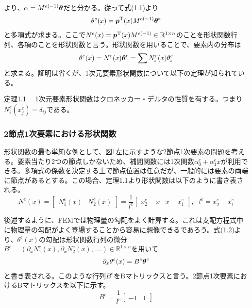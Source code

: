 \documentclass[dvipdfmx, 9pt, a4paper]{jsarticle}
\numberwithin{equation}{section}
\newcommand{\bm}[1]{{\mbox{\boldmath $#1$}}}
\begin{document}
より、$\alpha = M^{e(-1)}\bm \theta$だと分かる。従って式(1.1)より
\begin{equation}
\theta^e(x)=\bm p^{\rm T}(x)M^{e(-1)}\bm \theta^e \notag
\end{equation}
と多項式が求まる。ここで$N^e(x)=\bm p^{\rm T}(x)M^{e(-1)} \in \mathbb{R}^{1 \times n}$のことを形状関数行列、各項のことを形状関数と言う。形状関数を用いることで、要素内の分布は
\begin{equation}
\theta^e(x)=N^e(x)\bm \theta^e = \sum N^e_i(x)\theta^e_i
\end{equation}
と求まる。証明は省くが、1次元要素形状関数について以下の定理が知られている。
\begin{itembox}[l]{定理1.1}
　1次元要素形状関数はクロネッカー・デルタの性質を有する。つまり$N^e_i(x^e_j)=\delta_{ij}$である。
\end{itembox}
\subsubsection{2節点1次要素における形状関数}
形状関数の最も単純な例として、図1左に示すような2節点1次要素の問題を考える。要素当たり2つの節点しかないため、補間関数には1次関数$\alpha^e_0+\alpha^e_1x$が利用できる。多項式の係数を決定する上で節点位置は任意だが、一般的には要素の両端に節点があるとする。この場合、定理1.1より形状関数は以下のように書き表される。
\begin{equation}
N^e(x)=
\begin{bmatrix}
N^e_1(x) & N^e_2(x)
\end{bmatrix}
=\frac{1}{l^e}
\begin{bmatrix}
x^e_2 - x & x - x^e_1
\end{bmatrix},~~~l^e = x^e_2 - x^e_1
\end{equation}\par
後述するように、FEMでは物理量の勾配をよく計算する。これは支配方程式中に物理量の勾配がよく登場することから容易に想像できるであろう。式(1.2)より、$\theta^e(x)$の勾配は形状関数行列の微分$B^e=(\partial_xN^e_1(x), \partial_xN^e_2(x), ....) \in \mathbb{R}^{1\times n}$を用いて
\begin{equation}
\partial_x\theta^e(x)=B^e\bm \theta^e
\end{equation}
と書き表される。このような行列$B^e$をBマトリックスと言う。2節点1次要素におけるBマトリックスを以下に示す。
\begin{equation}
B^e = \frac{1}{l^e}
\begin{bmatrix}
-1 & 1
\end{bmatrix}
\end{equation}
\end{document}
